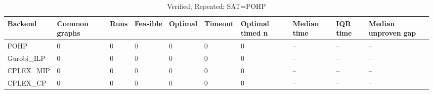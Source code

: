 \begin{table}[htbp]
\centering
\caption{Verified; Repeated; SAT=POHP}
\label{tab:p2b-Repeated-backends}
\begin{tabular}{llllllllll}
\hline
Backend & Common graphs & Runs & Feasible & Optimal & Timeout & Optimal timed n & Median time & IQR time & Median unproven gap \\
\hline
POHP & 0 & 0 & 0 & 0 & 0 & 0 & -- & -- & -- \\
Gurobi\_ILP & 0 & 0 & 0 & 0 & 0 & 0 & -- & -- & -- \\
CPLEX\_MIP & 0 & 0 & 0 & 0 & 0 & 0 & -- & -- & -- \\
CPLEX\_CP & 0 & 0 & 0 & 0 & 0 & 0 & -- & -- & -- \\
\hline
\end{tabular}
\end{table}

